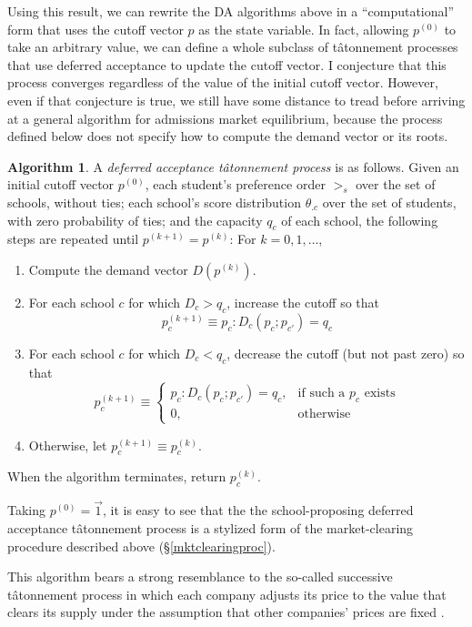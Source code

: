 \documentclass[12pt]{article}
\theoremstyle{definition}
\newtheorem{algorithm}{Algorithm}
\begin{document}
Using this result, we can rewrite the DA algorithms above in a ``computational'' form that uses the cutoff vector $p$ as the state variable. In fact, allowing $p^{(0)}$ to take an arbitrary value, we can define a whole subclass of t\^{a}tonnement processes that use deferred acceptance to update the cutoff vector. I conjecture that this process converges regardless of the value of the initial cutoff vector. However, even if that conjecture is true, we still have some distance to tread before arriving at a general algorithm for admissions market equilibrium, because the process defined below does not specify how to compute the demand vector or its roots.
\begin{algorithm}
A \emph{deferred acceptance t\^{a}tonnement process} is as follows. Given an initial cutoff vector $p^{(0)}$, each student's preference order $>_s$ over the set of schools, without ties;  each school's score distribution $\theta_{.c}$ over the set of students, with zero probability of ties; and the capacity $q_c$ of each school, the following steps are repeated until $p^{(k+1)} = p^{(k)}$: For $k = 0, 1, \dots$, 
\begin{enumerate}
\item Compute the demand vector $D (p^{(k)})$. 
\item For each school $c$ for which $D_c > q_c$, increase the cutoff so that
\[p_c^{(k+1)} \equiv p_c: D_c(p_c; p_{c'} ) = q_c\]
\item For each school $c$ for which $D_c < q_c$, decrease the cutoff (but not past zero) so that
\[p_c^{(k+1)} \equiv \begin{cases}
p_c: D_c(p_c; p_{c'} ) = q_c, &\text{if such a } p_c \text{ exists}\\
0, &\text{otherwise}
\end{cases}\]
\item Otherwise, let $p_c^{(k+1)} \equiv p_c^{(k)}$.
\end{enumerate}
When the algorithm terminates, return $p_c^{(k)}$. 
\end{algorithm}
Taking $p^{(0)} = \vec 1$, it is easy to see that the the school-proposing deferred acceptance t\^{a}tonnement process is a stylized form of the market-clearing procedure described above (\S\ref{mktclearingproc}).

This algorithm bears a strong resemblance to the so-called successive t\^{a}tonnement process in which each company adjusts its price to the value that clears its supply under the assumption that other companies' prices are fixed \parencite[see][eqn. 6]{walrastatonnement}. 
\end{document}
